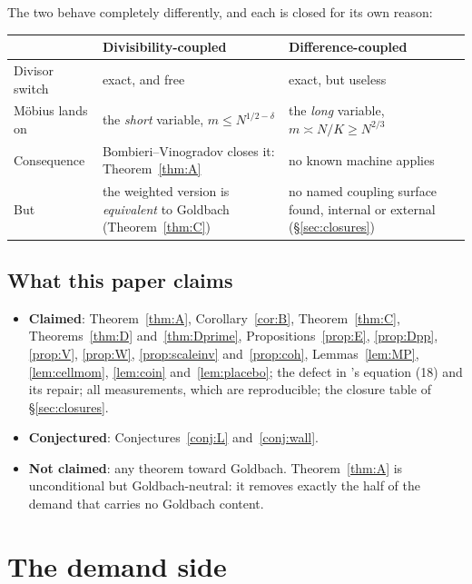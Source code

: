 \documentclass[11pt,a4paper]{article}
\theoremstyle{plain}
\theoremstyle{definition}
\begin{document}
\noindent
The two behave completely differently, and each is closed for its own
reason:

\begin{center}
\begin{tabular}{p{}p{}p{}}
\hline
 & \textbf{Divisibility-coupled} & \textbf{Difference-coupled}\\
\hline
Divisor switch & exact, and free & exact, but useless\\
M\"obius lands on & the \emph{short} variable, $m\le N^{1/2-\delta}$ &
 the \emph{long} variable, $m \asymp N/K \ge N^{2/3}$\\
Consequence & Bombieri--Vinogradov closes it: Theorem~\ref{thm:A} &
 no known machine applies\\
But & the weighted version is \emph{equivalent} to Goldbach
 (Theorem~\ref{thm:C}) & no named coupling surface found, internal or
 external (\S\ref{sec:closures})\\
\hline
\end{tabular}
\end{center}

\subsection{What this paper claims}

\begin{itemize}
\item \textbf{Claimed}: Theorem~\ref{thm:A}, Corollary~\ref{cor:B},
  Theorem~\ref{thm:C}, Theorems~\ref{thm:D} and~\ref{thm:Dprime},
  Propositions~\ref{prop:E}, \ref{prop:Dpp}, \ref{prop:V},
  \ref{prop:W}, \ref{prop:scaleinv} and~\ref{prop:coh},
  Lemmas~\ref{lem:MP}, \ref{lem:cellmom}, \ref{lem:coin}
  and~\ref{lem:placebo}; the defect in \cite{HL}'s equation (18) and
  its repair; all measurements, which are reproducible; the closure
  table of \S\ref{sec:closures}.
\item \textbf{Conjectured}: Conjectures~\ref{conj:L}
  and~\ref{conj:wall}.
\item \textbf{Not claimed}: any theorem toward Goldbach.
  Theorem~\ref{thm:A} is unconditional but Goldbach-neutral: it
  removes exactly the half of the demand that carries no Goldbach
  content.
\end{itemize}

\section{The demand side}\label{sec:demand}
\end{document}
